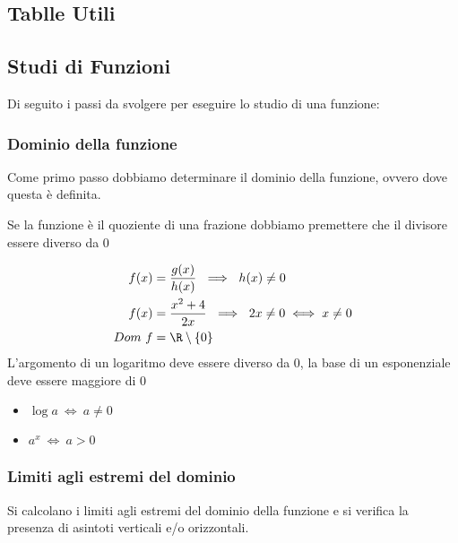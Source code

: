 \documentclass[../analisi.tex]{subfiles}
\begin{document}
\subsection{Tablle Utili}%
\label{sub:tablle_utili}


\clearpage

\clearpage


\subsection{Studi di Funzioni}%
\label{sub:studi_di_funzioni} 
Di seguito i passi da svolgere per eseguire lo studio di una funzione:
\subsubsection{Dominio della funzione}
Come primo passo dobbiamo determinare il dominio della funzione,
ovvero dove questa è definita.

\begin{esem}
Se la funzione è il quoziente di una frazione dobbiamo premettere che il divisore
 essere diverso da 0

\begin{equation}
	\begin{aligned}
		f ( x ) &= \frac{g(x)}{h(x)}\ \implies\ h(x) \neq 0\\
		f ( x ) &= \frac{x^2 + 4}{2x}\ \implies\ 2x \neq 0 \iff x \neq 0\\ 
		Dom\ f 	&= \R \setminus\{0\}
	\end{aligned}
\end{equation}
L'argomento di un logaritmo deve essere diverso da 0, la base di un esponenziale 
deve essere maggiore di 0

\begin{itemize}
	\item $ \log a\ \iff\ a \neq 0 $ 
	\item $ a^x\ \iff\ a > 0$
\end{itemize}
\end{esem}

\subsubsection{Limiti agli estremi del dominio}
Si calcolano i limiti agli estremi del dominio della funzione e si verifica 
la presenza di asintoti verticali e/o orizzontali.\\
\end{document}
